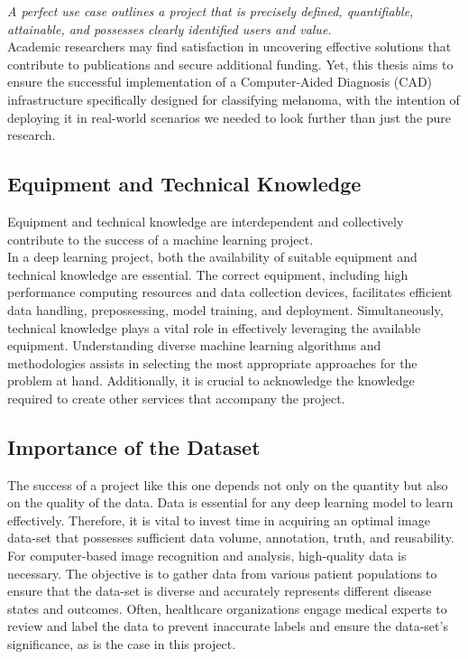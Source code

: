 \textit{A perfect use case outlines a project that is precisely defined, quantifiable, attainable, and possesses clearly identified users and value.} \\

Academic researchers may find satisfaction in uncovering effective solutions that contribute to publications
and secure additional funding. Yet, this thesis aims to ensure the successful implementation of a Computer-Aided Diagnosis (CAD)
infrastructure specifically designed for classifying melanoma,
with the intention of deploying it in real-world scenarios we needed to look further than just the pure research. \\

\subsection{Equipment and Technical Knowledge}

Equipment and technical knowledge are interdependent and collectively contribute to the success of a machine learning project. \\

In a deep learning project, both the availability of suitable equipment and technical knowledge are essential. The correct equipment, including high performance computing resources and data collection devices, facilitates efficient data handling, prepossessing, model training, and deployment. Simultaneously, technical knowledge plays a vital role in effectively leveraging the available equipment. Understanding diverse machine learning algorithms and methodologies assists in selecting the most appropriate approaches for the problem at hand. Additionally, it is crucial to acknowledge the knowledge required to create other services that accompany the project. \\

\subsection{Importance of the Dataset}

The success of a project like this one depends not only on the quantity but also on the quality of the data. Data is essential for any deep learning model to learn effectively. Therefore, it is vital to invest time in
acquiring an optimal image data-set that possesses sufficient data volume, annotation, truth, and reusability. \\

For computer-based image recognition and analysis, high-quality data is necessary. The objective is to gather data from various patient populations to ensure that the data-set is diverse and accurately represents different disease states and outcomes. Often, healthcare organizations engage medical experts to review and label the data to prevent inaccurate labels and ensure the data-set's significance, as is the case in this project.

